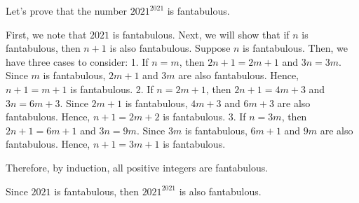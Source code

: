 Let's prove that the number \(2021^{2021}\) is fantabulous.

First, we note that \(2021\) is fantabulous.  
Next, we will show that if \(n\) is fantabulous, then \(n+1\) is also fantabulous.  
Suppose \(n\) is fantabulous. Then, we have three cases to consider:
1. If \(n = m\), then \(2n+1 = 2m+1\) and \(3n = 3m\). Since \(m\) is fantabulous, \(2m+1\) and \(3m\) are also fantabulous. Hence, \(n+1 = m+1\) is fantabulous.
2. If \(n = 2m+1\), then \(2n+1 = 4m+3\) and \(3n = 6m+3\). Since \(2m+1\) is fantabulous, \(4m+3\) and \(6m+3\) are also fantabulous. Hence, \(n+1 = 2m+2\) is fantabulous.
3. If \(n = 3m\), then \(2n+1 = 6m+1\) and \(3n = 9m\). Since \(3m\) is fantabulous, \(6m+1\) and \(9m\) are also fantabulous. Hence, \(n+1 = 3m+1\) is fantabulous.

Therefore, by induction, all positive integers are fantabulous.

Since \(2021\) is fantabulous, then \(2021^{2021}\) is also fantabulous.
